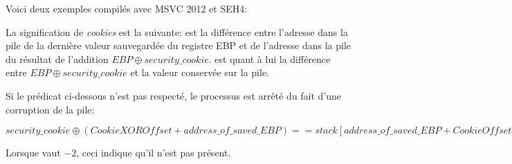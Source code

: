 \def\SEHfour{1}


Voici deux exemples compilés avec MSVC 2012 et SEH4:





La signification de \emph{cookies} est la suivante:  est la différence entre l'adresse
dans la pile de la dernière valeur sauvegardée du registre EBP et de l'adresse dans la pile du
résultat de l'addition $EBP \oplus security\_cookie$.
 est quant à lui la différence entre $EBP \oplus security\_cookie$ et la valeur
conservée sur la pile.

Si le prédicat ci-dessous n'est pas respecté, le processus est arrêté du fait d'une corruption
de la pile:

\begin{center}
$security\_cookie \oplus (CookieXOROffset + address\_of\_saved\_EBP) == stack[address\_of\_saved\_EBP + CookieOffset]$
\end{center}

Lorsque  vaut $-2$, ceci indique qu'il n'est pas présent.

\iffalse
\myindex{tracer}
La vérification des \emph{Cookies} est aussi implémentée dans mon \tracer{},
voir \href{https://github.com/DennisYurichev/tracer/blob/master/SEH.c}{GitHub} pour les détails.\\
\\
Pour les versions à partir de MSVC 2005, il est toujours possible de revenir à la version SEH3
en utilisant l'option \TT{/GS-}. Toutefois, le \ac{CRT} continue à utiliser SEH4.
\fi

